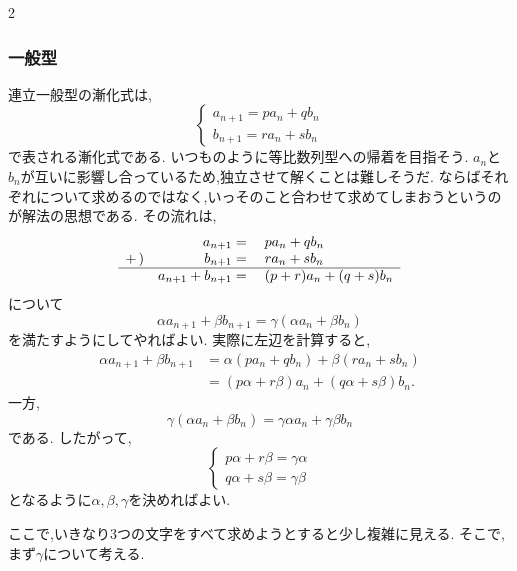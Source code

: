 \documentclass[dvipdfmx,a4paper,11pt,fleqn,openany]{jsbook}
\begin{document}
\begin{multicols*}{2}
    \subsubsection{一般型}
      連立一般型の漸化式は,
      \[
        \begin{cases}
          a_{n+1}=pa_{n}+qb_{n} \\
          b_{n+1}=ra_{n}+sb_{n}
        \end{cases}
      \]
      で表される漸化式である.
      いつものように等比数列型への帰着を目指そう.
      $a_n$と$b_n$が互いに影響し合っているため,独立させて解くことは難しそうだ.
      ならばそれぞれについて求めるのではなく,いっそのこと合わせて求めてしまおうというのが解法の思想である.
      その流れは,
      \[
        \begin{array}{rrl}
          & a_{n+1}={} &pa_{n}+qb_{n}\\
          +\,) & b_{n+1}={} & ra_{n}+sb_{n}\\ \hline
          & a_{n+1}+b_{n+1}={} & (p+r)a_{n}+(q+s)b_{n}
        \end{array}
      \]
      について
      \[
        \alpha a_{n+1}+\beta b_{n+1}
        =\gamma(\alpha a_n+\beta b_n)
      \]
      を満たすようにしてやればよい.
      実際に左辺を計算すると,
      \begin{align*}
        \alpha a_{n+1}+\beta b_{n+1}&=\alpha(pa_n+qb_n)+\beta(ra_n+sb_n)\\
        &=(p\alpha+r\beta)a_n+(q\alpha+s\beta)b_n.
      \end{align*}
      一方,
      \[
        \gamma(\alpha a_n+\beta b_n)=\gamma\alpha a_n+\gamma\beta b_n
      \]
      である.
      したがって,
      \[
      \begin{cases}
        p\alpha+r\beta=\gamma\alpha\\
        q\alpha+s\beta=\gamma\beta
      \end{cases}
      \]
      となるように$\alpha,\beta,\gamma$を決めればよい.

      ここで,いきなり3つの文字をすべて求めようとすると少し複雑に見える.
      そこで,まず$\gamma$について考える.


\end{multicols*}
\end{document}
